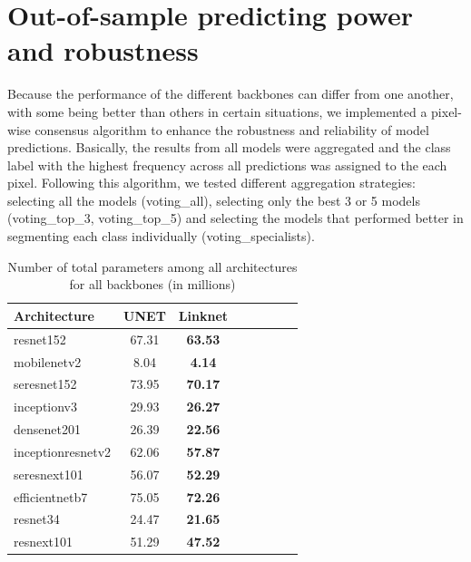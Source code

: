\section{Out-of-sample predicting power and
  robustness}\label{app:out_of_sample}

Because the performance of the different backbones can differ from one
another, with some being better than others in certain situations, we
implemented a pixel-wise consensus algorithm to enhance the robustness and
reliability of model predictions. Basically, the results from all models were
aggregated and the class label with the highest frequency across all
predictions was assigned to the each pixel. Following this algorithm, we tested
different aggregation strategies: selecting all the models (voting\_all),
selecting only the best 3 or 5 models (voting\_top\_3, voting\_top\_5) and
selecting the models that performed better in segmenting each class
individually (voting\_specialists).

\begin{table}[H]
    \centering
    \caption[Number of parameters of each model]{Number of total parameters
        among all architectures for all
        backbones (in millions)}
    \label{tab:parameters-architectures}
    \begin{tabular}{lccccccc}
        \toprule
        \textbf{Architecture} & \textbf{UNET} & \textbf{Linknet} \\
        \midrule
        resnet152             & 67.31         & \textbf{63.53}   \\
        mobilenetv2           & 8.04          & \textbf{4.14}    \\
        seresnet152           & 73.95         & \textbf{70.17}   \\
        inceptionv3           & 29.93         & \textbf{26.27}   \\
        densenet201           & 26.39         & \textbf{22.56}   \\
        inceptionresnetv2     & 62.06         & \textbf{57.87}   \\
        seresnext101          & 56.07         & \textbf{52.29}   \\
        efficientnetb7        & 75.05         & \textbf{72.26}   \\
        resnet34              & 24.47         & \textbf{21.65}   \\
        resnext101            & 51.29         & \textbf{47.52}   \\
        \bottomrule
    \end{tabular}
\end{table}

